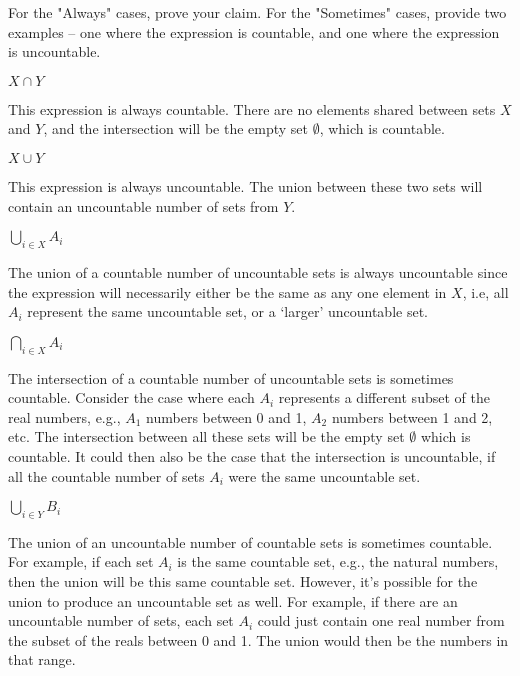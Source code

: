 \documentclass[11pt]{article}
\begin{document}
For the "Always" cases, prove your claim. For the "Sometimes" cases, provide
two examples -- one where the expression is countable, and one where
the expression is uncountable.

\begin{Parts}

\Part $X \cap Y$

\begin{solution}
    This expression is always countable. There are no elements shared between 
    sets $X$ and $Y$, and the intersection will be the empty set $\emptyset$,
    which is countable. 
\end{solution}

\Part $X \cup Y$

\begin{solution}
    This expression is always uncountable. The union between these two sets will
    contain an uncountable number of sets from $Y$.
\end{solution}
	
\Part $\bigcup_{i \in X} A_i$

\begin{solution}
    The union of a countable number of uncountable sets is always uncountable
    since the expression will necessarily either be the same as any one element
    in $X$, i.e, all $A_i$ represent the same uncountable set, or a `larger' 
    uncountable set.
\end{solution}

\Part $\bigcap_{i \in X} A_i$

\begin{solution}
    The intersection of a countable number of uncountable sets is sometimes
    countable. Consider the case where each $A_i$ represents a different 
    subset of the real numbers, e.g., $A_1$ numbers between 0 and 1, $A_2$
    numbers between 1 and 2, etc. The intersection between all these sets 
    will be the empty set $\emptyset$ which is countable. It could then also
    be the case that the intersection is uncountable, if all the countable
    number of sets $A_i$ were the same uncountable set. 
\end{solution}

\Part $\bigcup_{i \in Y} B_i$

\begin{solution}
    The union of an uncountable number of countable sets is sometimes countable.
    For example, if each set $A_i$ is the same countable set, e.g., the natural
    numbers, then the union will be this same countable set. However, it's
    possible for the union to produce an uncountable set as well. For example, 
    if there are an uncountable number of sets, each set $A_i$ could just contain
    one real number from the subset of the reals between 0 and 1. The union would
    then be the numbers in that range.
\end{solution}


\end{Parts}
\end{document}
